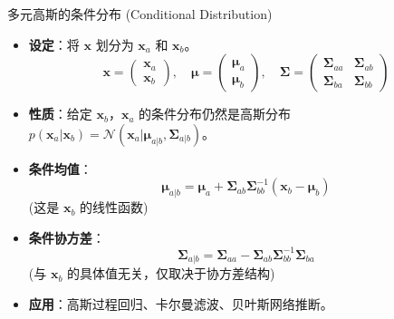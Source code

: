 \documentclass[12pt, aspectratio=169]{beamer}
\newcommand{\vect}[1]{\mathbf{#1}}
\newcommand{\N}{\mathcal{N}}
\begin{document}
\begin{frame}{多元高斯的条件分布 (Conditional Distribution)}
    \begin{itemize}
        \item \textbf{设定}：将 $\vect{x}$ 划分为 $\vect{x}_a$ 和 $\vect{x}_b$。
        $$ \vect{x} = \begin{pmatrix} \vect{x}_a \\ \vect{x}_b \end{pmatrix}, \quad \boldsymbol{\mu} = \begin{pmatrix} \boldsymbol{\mu}_a \\ \boldsymbol{\mu}_b \end{pmatrix}, \quad \boldsymbol{\Sigma} = \begin{pmatrix} \boldsymbol{\Sigma}_{aa} & \boldsymbol{\Sigma}_{ab} \\ \boldsymbol{\Sigma}_{ba} & \boldsymbol{\Sigma}_{bb} \end{pmatrix} $$
        \item \textbf{性质}：给定 $\vect{x}_b$，$\vect{x}_a$ 的条件分布仍然是高斯分布 $p(\vect{x}_a|\vect{x}_b) = \N(\vect{x}_a | \boldsymbol{\mu}_{a|b}, \boldsymbol{\Sigma}_{a|b})$。
        \item \textbf{条件均值}：
        $$ \boldsymbol{\mu}_{a|b} = \boldsymbol{\mu}_a + \boldsymbol{\Sigma}_{ab}\boldsymbol{\Sigma}_{bb}^{-1}(\vect{x}_b - \boldsymbol{\mu}_b) $$
        (这是 $\vect{x}_b$ 的线性函数)
        \item \textbf{条件协方差}：
        $$ \boldsymbol{\Sigma}_{a|b} = \boldsymbol{\Sigma}_{aa} - \boldsymbol{\Sigma}_{ab}\boldsymbol{\Sigma}_{bb}^{-1}\boldsymbol{\Sigma}_{ba} $$
        (与 $\vect{x}_b$ 的具体值无关，仅取决于协方差结构)
        \item \textbf{应用}：高斯过程回归、卡尔曼滤波、贝叶斯网络推断。
    \end{itemize}
\end{frame}
\end{document}
